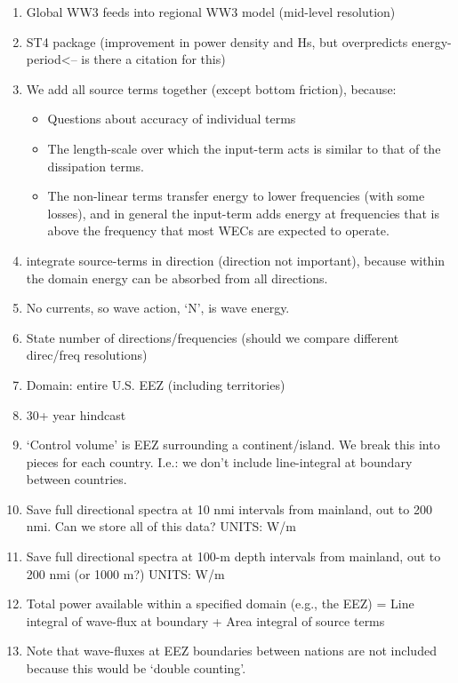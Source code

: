 \begin{enumerate}
\item Global WW3 feeds into regional WW3 model (mid-level resolution)
\item ST4 package (improvement in power density and Hs, but overpredicts energy-period<-- is there a citation for this)
\item We add all source terms together (except bottom friction), because:
  \begin{itemize}
  \item Questions about accuracy of individual terms \citep{garcia-medinaWaveResourceAssessment2014}
  \item The length-scale over which the input-term acts is similar to that of the dissipation terms.
  \item The non-linear terms transfer energy to lower frequencies (with some losses), and in general the input-term adds energy at frequencies that is above the frequency that most WECs are expected to operate. 
  \end{itemize}
\item integrate source-terms in direction (direction not important), because within the domain energy can be absorbed from all directions.
\item No currents, so wave action, ‘N’, is wave energy.
\item State number of directions/frequencies (should we compare different direc/freq resolutions)
\item Domain: entire U.S. EEZ (including territories)
\item 30+ year hindcast
\item ‘Control volume’ is EEZ surrounding a continent/island. We break this into pieces for each country. I.e.: we don’t include line-integral at boundary between countries.
\item Save full directional spectra at 10 nmi intervals from mainland, out to 200 nmi. Can we store all of this data? UNITS: W/m
\item Save full directional spectra at 100-m depth intervals from mainland, out to 200 nmi (or 1000 m?) UNITS: W/m
\item Total power available within a specified domain (e.g., the EEZ) = Line integral of wave-flux at boundary + Area integral of source terms
\item Note that wave-fluxes at EEZ boundaries between nations are not included because this would be ‘double counting’.
\end{enumerate}

